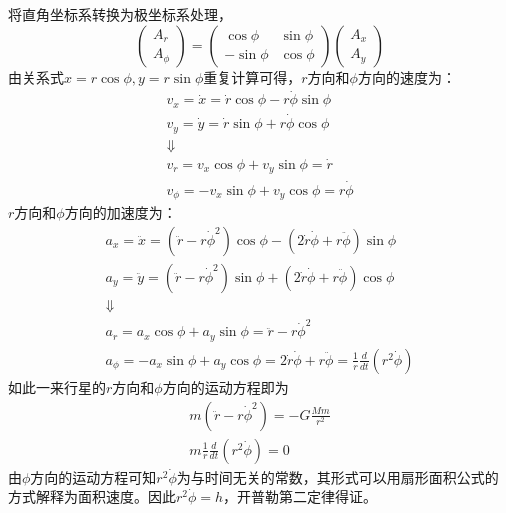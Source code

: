 将直角坐标系转换为极坐标系处理，
\begin{equation*}
    \begin{pmatrix}
        A_r\\ A_\phi
    \end{pmatrix}=
    \begin{pmatrix}
        \cos\phi & \sin\phi\\
        -\sin\phi & \cos\phi
    \end{pmatrix}
    \begin{pmatrix}
        A_x\\ A_y
    \end{pmatrix}
\end{equation*}
由关系式$x=r\cos\phi,y=r\sin\phi$重复计算可得，$r$方向和$\phi$方向的速度为：
\begin{gather*}
    v_x=\dot{x}=\dot{r}\cos\phi-r\dot{\phi}\sin\phi\\
    v_y=\dot{y}=\dot{r}\sin\phi+r\dot{\phi}\cos\phi\\
    \Downarrow\\
    v_r=v_x\cos\phi+v_y\sin\phi=\dot{r}\\
    v_\phi=-v_x\sin\phi+v_y\cos\phi=r\dot{\phi}
\end{gather*}
$r$方向和$\phi$方向的加速度为：
\begin{gather*}
    a_x=\ddot{x}=(\ddot{r}-r\dot{\phi}^2)\cos\phi-(2\dot{r}\dot{\phi}+r\ddot{\phi})\sin\phi\\
    a_y=\ddot{y}=(\ddot{r}-r\dot{\phi}^2)\sin\phi+(2\dot{r}\dot{\phi}+r\ddot{\phi})\cos\phi\\
    \Downarrow\\
    a_r=a_x\cos\phi+a_y\sin\phi=\ddot{r}-r\dot{\phi}^2\\
    a_\phi=-a_x\sin\phi+a_y\cos\phi=2\dot{r}\dot{\phi}+r\ddot{\phi}=\frac1r\frac{d}{dt}(r^2\dot{\phi})
\end{gather*}
如此一来行星的$r$方向和$\phi$方向的运动方程即为
\begin{gather*}
    m(\ddot{r}-r\dot{\phi}^2)=-G\frac{Mm}{r^2}\\
    m\frac1r\frac{d}{dt}(r^2\dot{\phi})=0
\end{gather*}
由$\phi$方向的运动方程可知$r^2\dot{\phi}$为与时间无关的常数，其形式可以用扇形面积公式的方式解释为面积速度。因此$r^2\dot{\phi}=h$，开普勒第二定律得证。


